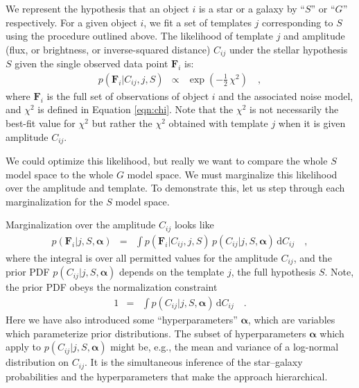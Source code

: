 \documentclass[12pt,preprint]{aastex}
\newcommand{\datavector}[1]{\boldsymbol{#1}}
\newcommand{\flux}{\datavector{F}}
\newcommand{\hyperpars}{\datavector{\alpha}}
\newcommand{\dd}{\mathrm{d}}
\begin{document}
We represent the hypothesis that an object $i$ is a star or a galaxy
by ``$S$'' or ``$G$'' respectively.  For a given object $i$, we fit a
set of templates $j$ corresponding to $S$ using the procedure outlined
above.  The likelihood of template $j$ and amplitude (flux, or
brightness, or inverse-squared distance) $C_{ij}$ under the stellar
hypothesis $S$ given the single observed data point $\flux_i$ is:
\begin{eqnarray}\displaystyle
p(\flux_i|C_{ij},j,S) & \propto & \exp(-\frac{1}{2}\,\chi^2)
\quad ,
\end{eqnarray}
where $\flux_i$ is the full set of observations of object $i$ and the
associated noise model, and $\chi^2$ is defined in Equation \ref{eqn:chi}. Note
that the $\chi^2$ is not necessarily the best-fit value for $\chi^2$
but rather the $\chi^2$ obtained with template $j$ when it is given
amplitude $C_{ij}$.

We could optimize this likelihood, but really we want to compare the
whole $S$ model space to the whole $G$ model space.  We must
marginalize this likelihood over the amplitude and template.  To 
demonstrate this, let us step through each marginalization for the 
$S$ model space.

Marginalization over the amplitude $C_{ij}$ looks like
\begin{eqnarray}\displaystyle
p(\flux_i|j,S,\hyperpars) & = & \int p(\flux_i|C_{ij},j,S)\,p(C_{ij}|j,S,\hyperpars)\,\dd C_{ij}
\quad ,
\end{eqnarray}
where the integral is over all permitted values for the amplitude
$C_{ij}$, and the prior PDF $p(C_{ij}|j,S,\hyperpars)$ depends on the
template $j$, the full hypothesis $S$.  Note, the prior PDF obeys the normalization
constraint
\begin{eqnarray}\displaystyle
1 & = & \int p(C_{ij}|j,S,\hyperpars)\,\dd C_{ij}
\quad .
\end{eqnarray}
\noindent Here we have also introduced some 
``hyperparameters'' $\hyperpars$, which are variables which parameterize 
prior distributions.  The subset of hyperparameters $\hyperpars$ which 
apply to $p(C_{ij}|j,S,\hyperpars)$ might be, e.g., the mean and variance of 
a log-normal distribution on $C_{ij}$.   It is the simultaneous inference
of the star--galaxy probabilities and the hyperparameters that
make the approach hierarchical.  
\end{document}
